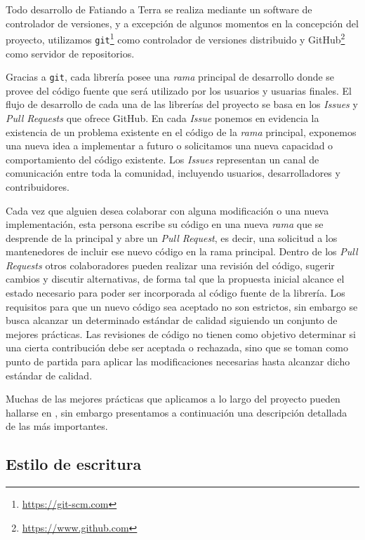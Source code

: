 Todo desarrollo de Fatiando a Terra se realiza mediante un software de
controlador de versiones, y a excepción de algunos momentos en la concepción
del proyecto, utilizamos \texttt{git}\footnote{\url{https://git-scm.com}} como
controlador de versiones distribuido
y GitHub\footnote{\url{https://www.github.com}} como servidor de repositorios.

Gracias a \texttt{git}, cada librería posee una \emph{rama} principal de
desarrollo donde se provee del código fuente que será utilizado por los
usuarios y usuarias finales.
El flujo de desarrollo de cada una de las librerías del proyecto se basa en los
\emph{Issues} y \emph{Pull Requests} que ofrece GitHub.
En cada \emph{Issue} ponemos en evidencia la existencia de un problema
existente en el código de la \emph{rama} principal, exponemos una nueva idea
a implementar a futuro o solicitamos una nueva capacidad o comportamiento del
código existente.
Los \emph{Issues} representan un canal de comunicación entre toda la comunidad,
incluyendo usuarios, desarrolladores y contribuidores.

Cada vez que alguien desea colaborar con alguna modificación o una nueva
implementación, esta persona escribe su código en una nueva \emph{rama} que
se desprende de la principal y abre un \emph{Pull Request}, es decir, una
solicitud a los mantenedores de incluir ese nuevo código en la rama principal.
Dentro de los \emph{Pull Requests} otros colaboradores pueden realizar una
revisión del código, sugerir cambios y discutir alternativas, de forma tal que
la propuesta inicial alcance el estado necesario para poder ser incorporada
al código fuente de la librería.
Los requisitos para que un nuevo código sea aceptado no son estrictos, sin
embargo se busca alcanzar un determinado estándar de calidad siguiendo un
conjunto de mejores prácticas.
Las revisiones de código no tienen como objetivo determinar si una cierta
contribución debe ser aceptada o rechazada, sino que se toman como punto de
partida para aplicar las modificaciones necesarias hasta alcanzar dicho
estándar de calidad.

Muchas de las mejores prácticas que aplicamos a lo largo del proyecto pueden
hallarse en \citet{wilson2014,wilson2017}, sin embargo presentamos
a continuación una descripción detallada de las más importantes.

\subsection{Estilo de escritura}

